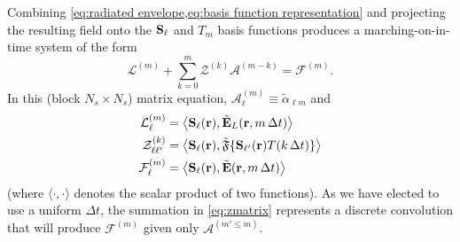 Combining \cref{eq:radiated envelope,eq:basis function representation} and projecting the resulting field onto the $\vb{S}_\ell$ and $T_m$ basis functions produces a marching-on-in-time system of the form
\begin{equation}
  \mathcal{L}^{(m)} + \sum_{k = 0}^{m} \mathcal{Z}^{(k)} \mathcal{A}^{(m - k)} = \mathcal{F}^{(m)}.
  \label{eq:zmatrix}
\end{equation}
In this (block $N_s \times N_s$) matrix equation, $\mathcal{A}^{(m)}_\ell \equiv \tilde{\alpha}_{\ell m}$ and
\begin{subequations}
  \begin{align}
    \mathcal{L}^{(m)}_{\ell} &= \big\langle \mathbf{S}_\ell(\vb{r}), \tilde{\vb{E}}_L(\vb{r}, m \, \Delta t) \big\rangle \\
    \mathcal{Z}^{(k)}_{\ell \ell'} &= \big\langle \mathbf{S}_\ell(\vb{r}), \tilde{\mathfrak{F}}\{ \mathbf{S}_{\ell'}(\mathbf{r}) T(k \, \Delta t) \} \big\rangle \\
    \mathcal{F}^{(m)}_\ell &= \big\langle \mathbf{S}_\ell(\vb{r}), \tilde{\mathbf{E}}(\vb{r}, m \, \Delta t) \big\rangle
  \end{align}
  \label{eq:projections}
\end{subequations}
(where $\langle \cdot, \cdot \rangle$ denotes the scalar product of two functions).
As we have elected to use a uniform $\Delta t$, the summation in \cref{eq:zmatrix} represents a discrete convolution that will produce $\mathcal{F}^{(m)}$ given only $\mathcal{A}^{(m' \le m)}$.

